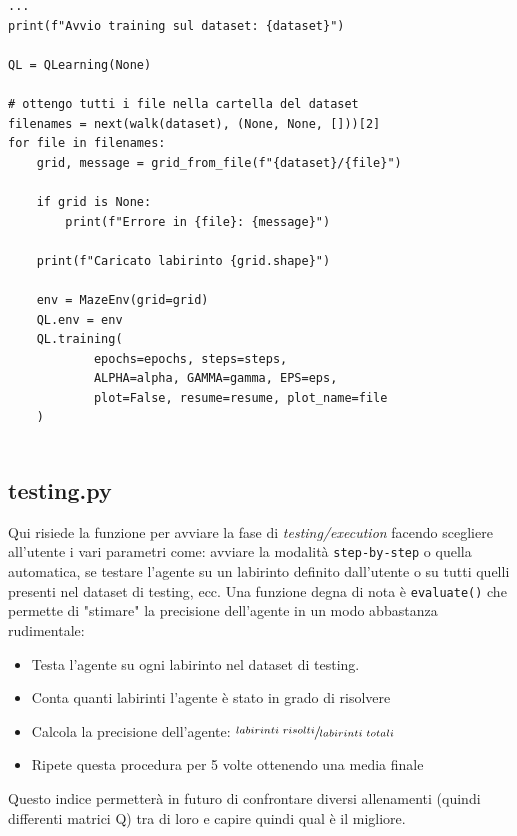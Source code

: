 \begin{lstlisting}[style=python, caption={Parte di codice della funzione che avvia la fase di allenamento utilizzando il dataset creato in precedenza}]
...
print(f"Avvio training sul dataset: {dataset}")

QL = QLearning(None)

# ottengo tutti i file nella cartella del dataset
filenames = next(walk(dataset), (None, None, []))[2]
for file in filenames:
	grid, message = grid_from_file(f"{dataset}/{file}")

	if grid is None:
		print(f"Errore in {file}: {message}")

	print(f"Caricato labirinto {grid.shape}")

	env = MazeEnv(grid=grid)
	QL.env = env
	QL.training(
			epochs=epochs, steps=steps, 
			ALPHA=alpha, GAMMA=gamma, EPS=eps, 
			plot=False, resume=resume, plot_name=file
	)
	
\end{lstlisting}

\subsection{testing.py}
\label{sec:testing}

Qui risiede la funzione per avviare la fase di \textit{testing/execution} facendo scegliere all'utente i vari parametri come: avviare la modalit\`{a} \lstinline[style=cmd]|step-by-step| o quella automatica, se testare l'agente su un labirinto definito dall'utente o su tutti quelli presenti nel dataset di testing, ecc. Una funzione degna di nota \`{e} \lstinline[style=cmd]|evaluate()| che permette di "stimare" la precisione dell'agente in un modo abbastanza rudimentale:

\begin{itemize}
	\item Testa l'agente su ogni labirinto nel dataset di testing.
	\item Conta quanti labirinti l'agente \`{e} stato in grado di risolvere
	\item Calcola la precisione dell'agente: $\sfrac{labirinti \ risolti}{labirinti \ totali}$
	\item Ripete questa procedura per 5 volte ottenendo una media finale
\end{itemize}

Questo indice permetter\`{a} in futuro di confrontare diversi allenamenti (quindi differenti matrici Q) tra di loro e capire quindi qual \`{e} il migliore.\\

